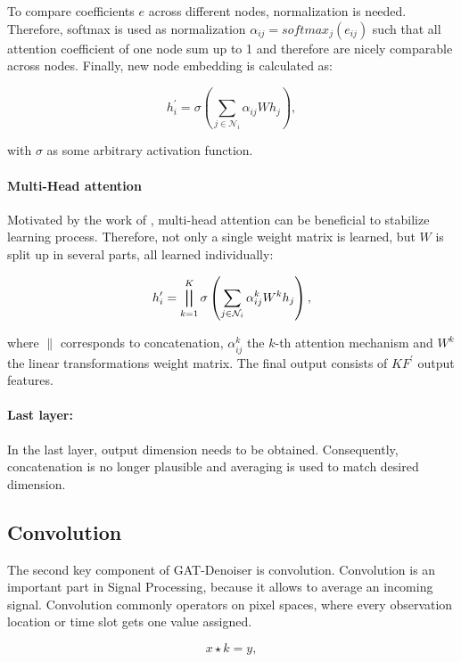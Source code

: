 To compare coefficients $e$ across different nodes, normalization is needed.
Therefore, softmax is used as normalization $\alpha_{ij} = softmax_j(e_{ij})$ 
such that all attention coefficient of one node sum up to 1 and therefore are nicely comparable across nodes.
Finally, new node embedding is calculated as:

\begin{equation}
  h_i^{\prime} = \sigma \left( \sum_{j \in \mathcal{N}_i} \alpha_{ij} W h_j \right),
\end{equation}

with $\sigma$ as some arbitrary activation function.

\paragraph{Multi-Head attention}
Motivated by the work of \citet{transformer}, multi-head attention can be beneficial to stabilize learning process.
Therefore, not only a single weight matrix is learned, but $W$ is split up in several parts, 
all learned individually:

\begin{equation}
  h_i^{\prime} = \bigparallel^K_{k=1} \sigma \left(\sum_{j \in \mathcal{N}_i} \alpha_{ij}^k W^k h_j \right),  
\end{equation}

where $\parallel$ corresponds to concatenation, $\alpha_{ij}^k$ the $k$-th attention mechanism and $W^k$ the linear
transformations weight matrix. The final output consists of $KF^{\prime}$ output features.

\paragraph{Last layer:}
In the last layer, output dimension needs to be obtained. 
Consequently, concatenation is no longer plausible and averaging is used to match desired dimension.

\subsection{Convolution}
The second key component of GAT-Denoiser is convolution.
Convolution is an important part in Signal Processing, because it allows to average an incoming signal.
Convolution commonly operators on pixel spaces, where every observation location or time slot gets one value assigned.

\begin{equation}
  x \star k = y,
\end{equation}

